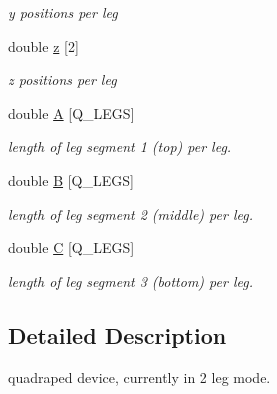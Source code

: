 \begin{DoxyCompactItemize}
\begin{DoxyCompactList}\small\item\em y positions per leg \item\end{DoxyCompactList}\item 
\hypertarget{class_c_q_ped_ae40c62791d6b39e550cb1d72c1872dd3}{
double \hyperlink{class_c_q_ped_ae40c62791d6b39e550cb1d72c1872dd3}{z} \mbox{[}2\mbox{]}}
\label{class_c_q_ped_ae40c62791d6b39e550cb1d72c1872dd3}

\begin{DoxyCompactList}\small\item\em z positions per leg \item\end{DoxyCompactList}\item 
\hypertarget{class_c_q_ped_a02a8f143bfecbe7e2fd0100c7dff24ec}{
double \hyperlink{class_c_q_ped_a02a8f143bfecbe7e2fd0100c7dff24ec}{A} \mbox{[}Q\_\-LEGS\mbox{]}}
\label{class_c_q_ped_a02a8f143bfecbe7e2fd0100c7dff24ec}

\begin{DoxyCompactList}\small\item\em length of leg segment 1 (top) per leg. \item\end{DoxyCompactList}\item 
\hypertarget{class_c_q_ped_ad94807db7fd7b916711f9b430130479c}{
double \hyperlink{class_c_q_ped_ad94807db7fd7b916711f9b430130479c}{B} \mbox{[}Q\_\-LEGS\mbox{]}}
\label{class_c_q_ped_ad94807db7fd7b916711f9b430130479c}

\begin{DoxyCompactList}\small\item\em length of leg segment 2 (middle) per leg. \item\end{DoxyCompactList}\item 
\hypertarget{class_c_q_ped_a955e4779b4f4923ad65cf2d4de0c1f18}{
double \hyperlink{class_c_q_ped_a955e4779b4f4923ad65cf2d4de0c1f18}{C} \mbox{[}Q\_\-LEGS\mbox{]}}
\label{class_c_q_ped_a955e4779b4f4923ad65cf2d4de0c1f18}

\begin{DoxyCompactList}\small\item\em length of leg segment 3 (bottom) per leg. \item\end{DoxyCompactList}\end{DoxyCompactItemize}


\subsection{Detailed Description}
quadraped device, currently in 2 leg mode. 

